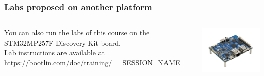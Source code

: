 \begin{frame}
\frametitle{Labs proposed on another platform}
  \begin{columns}
    You can also run the labs of this course on the STM32MP257F Discovery Kit board.\\
    \vspace{1em}
    Lab instructions are available at\\
    {\small \url{https://bootlin.com/doc/training/__SESSION_NAME__}}
    \begin{center}
      \includegraphics[width=\textwidth]{../slides/stm32mp2-board-also-supported/STM32MP257F-DK.png}
    \end{center}
  \end{columns}
\end{frame}
